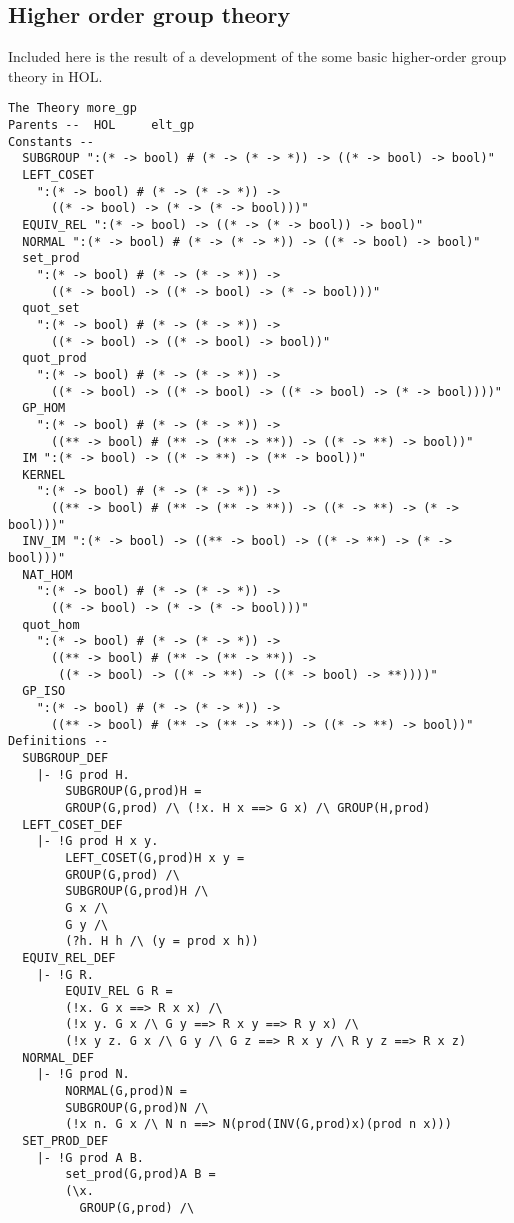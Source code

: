 \subsection{Higher order group theory}

Included here is the result of a development of the some basic higher-order
group theory in HOL.

\begin{verbatim}
The Theory more_gp
Parents --  HOL     elt_gp     
Constants --
  SUBGROUP ":(* -> bool) # (* -> (* -> *)) -> ((* -> bool) -> bool)"
  LEFT_COSET
    ":(* -> bool) # (* -> (* -> *)) ->
      ((* -> bool) -> (* -> (* -> bool)))"
  EQUIV_REL ":(* -> bool) -> ((* -> (* -> bool)) -> bool)"
  NORMAL ":(* -> bool) # (* -> (* -> *)) -> ((* -> bool) -> bool)"
  set_prod
    ":(* -> bool) # (* -> (* -> *)) ->
      ((* -> bool) -> ((* -> bool) -> (* -> bool)))"
  quot_set
    ":(* -> bool) # (* -> (* -> *)) ->
      ((* -> bool) -> ((* -> bool) -> bool))"
  quot_prod
    ":(* -> bool) # (* -> (* -> *)) ->
      ((* -> bool) -> ((* -> bool) -> ((* -> bool) -> (* -> bool))))"
  GP_HOM
    ":(* -> bool) # (* -> (* -> *)) ->
      ((** -> bool) # (** -> (** -> **)) -> ((* -> **) -> bool))"
  IM ":(* -> bool) -> ((* -> **) -> (** -> bool))"
  KERNEL
    ":(* -> bool) # (* -> (* -> *)) ->
      ((** -> bool) # (** -> (** -> **)) -> ((* -> **) -> (* -> bool)))"
  INV_IM ":(* -> bool) -> ((** -> bool) -> ((* -> **) -> (* -> bool)))"
  NAT_HOM
    ":(* -> bool) # (* -> (* -> *)) ->
      ((* -> bool) -> (* -> (* -> bool)))"
  quot_hom
    ":(* -> bool) # (* -> (* -> *)) ->
      ((** -> bool) # (** -> (** -> **)) ->
       ((* -> bool) -> ((* -> **) -> ((* -> bool) -> **))))"
  GP_ISO
    ":(* -> bool) # (* -> (* -> *)) ->
      ((** -> bool) # (** -> (** -> **)) -> ((* -> **) -> bool))"     
Definitions --
  SUBGROUP_DEF
    |- !G prod H.
        SUBGROUP(G,prod)H =
        GROUP(G,prod) /\ (!x. H x ==> G x) /\ GROUP(H,prod)
  LEFT_COSET_DEF
    |- !G prod H x y.
        LEFT_COSET(G,prod)H x y =
        GROUP(G,prod) /\
        SUBGROUP(G,prod)H /\
        G x /\
        G y /\
        (?h. H h /\ (y = prod x h))
  EQUIV_REL_DEF
    |- !G R.
        EQUIV_REL G R =
        (!x. G x ==> R x x) /\
        (!x y. G x /\ G y ==> R x y ==> R y x) /\
        (!x y z. G x /\ G y /\ G z ==> R x y /\ R y z ==> R x z)
  NORMAL_DEF
    |- !G prod N.
        NORMAL(G,prod)N =
        SUBGROUP(G,prod)N /\
        (!x n. G x /\ N n ==> N(prod(INV(G,prod)x)(prod n x)))
  SET_PROD_DEF
    |- !G prod A B.
        set_prod(G,prod)A B =
        (\x.
          GROUP(G,prod) /\

\end{verbatim}
